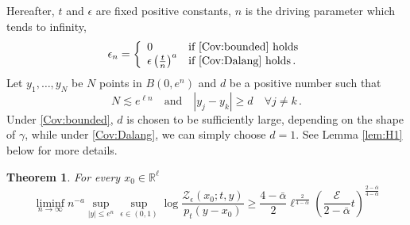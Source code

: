 \documentclass[12pt,reqno]{amsart}
\newtheorem{theorem}{Theorem}[section]
\theoremstyle{remark}
\newcommand{\1}{\mathbf{1}}
\def\RR{\mathbb{R}}
\def\Z{\mathcal{Z}}
\def\cee{{\mathcal E}}
\def\lt{\left}
\def\rt{\right}
\begin{document}
	Hereafter, $t$ and $\epsilon$ are  fixed positive constants, $n$ is the driving parameter which tends to infinity, 
		\begin{equation}\label{eq: ep R}
			\epsilon_n=
			\lt\{
			\begin{array}{ll}
				0& \text{if \ref{Cov:bounded} holds}
			 	\\\epsilon\lt(\frac t{n} \rt)^a &\text{if \ref{Cov:Dalang} holds}\,.
			\end{array} 
			\rt.
		\end{equation} 
		Let $y_1,\dots,y_N$ be $N$ points in $B(0,e^n)$ and $d$ be a positive number such that
		\begin{equation}\label{y.pts}
			N\lesssim e^{\ell n}\quad \mbox{and}\quad |y_j-y_k|\ge d\quad\forall j\neq k\,.
		\end{equation}
		Under \ref{Cov:bounded}, $d$ is chosen to be sufficiently large, depending on the shape of $\gamma$, while under \ref{Cov:Dalang}, we can simply choose $d=1$. See Lemma \ref{lem:H1} below for more details.
	\begin{theorem}\label{thm:low} For every $x_0\in\RR^\ell$
		\begin{equation}
			\liminf_{n\to\infty}n^{-a}\sup_{|y|\le e^n}\sup_{\epsilon\in(0,1)} \log \frac{\Z_\epsilon(x_0;t,y)}{p_t(y-x_0)}\ge \frac{4-\bar \alpha}2\ell^{\frac{2}{4-\bar \alpha}}\lt(\frac{\cee}{2-\bar \alpha}t \rt)^{\frac{2-\bar \alpha}{4-\bar \alpha}}
		\end{equation}
	\end{theorem}
\end{document}
